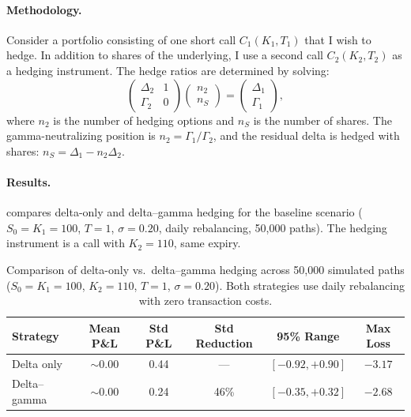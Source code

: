 \documentclass[11pt,a4paper]{article}
\begin{document}
\paragraph{Methodology.}
Consider a portfolio consisting of one short call $C_1(K_1, T_1)$ that I wish to hedge. In addition to shares of the underlying, I use a second call $C_2(K_2, T_2)$ as a hedging instrument. The hedge ratios are determined by solving:
\begin{equation}\label{eq:delta_gamma_system}
    \begin{pmatrix} \Delta_2 & 1 \\ \Gamma_2 & 0 \end{pmatrix}
    \begin{pmatrix} n_2 \\ n_S \end{pmatrix} =
    \begin{pmatrix} \Delta_1 \\ \Gamma_1 \end{pmatrix},
\end{equation}
where $n_2$ is the number of hedging options and $n_S$ is the number of shares. The gamma-neutralizing position is $n_2 = \Gamma_1 / \Gamma_2$, and the residual delta is hedged with shares: $n_S = \Delta_1 - n_2 \Delta_2$.

\paragraph{Results.}
 compares delta-only and delta--gamma hedging for the baseline scenario ($S_0 = K_1 = 100$, $T = 1$, $\sigma = 0.20$, daily rebalancing, 50{,}000 paths). The hedging instrument is a call with $K_2 = 110$, same expiry.

\begin{table}[H]
    \centering
    \caption{Comparison of delta-only vs.\ delta--gamma hedging across 50{,}000 simulated paths ($S_0 = K_1 = 100$, $K_2 = 110$, $T = 1$, $\sigma = 0.20$). Both strategies use daily rebalancing with zero transaction costs.}
    \label{tab:delta_gamma}
    \begin{tabular}{lccccc}
        \toprule
        \textbf{Strategy} & \textbf{Mean P\&L} & \textbf{Std P\&L} & \textbf{Std Reduction} & \textbf{95\% Range} & \textbf{Max Loss} \\
        \midrule
        Delta only          & $\sim$0.00 & 0.44 & ---   & $[-0.92, +0.90]$ & $-3.17$ \\
        Delta--gamma        & $\sim$0.00 & 0.24 & 46\%  & $[-0.35, +0.32]$ & $-2.68$ \\
        \bottomrule
    \end{tabular}
\end{table}
\end{document}
